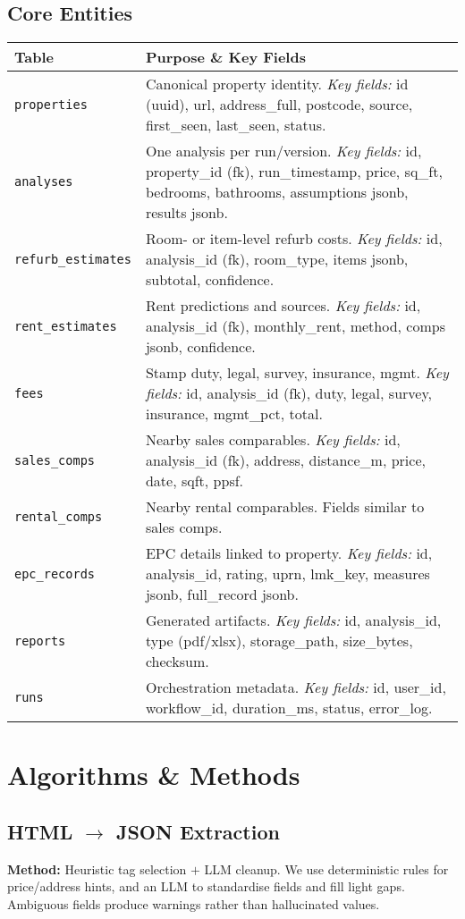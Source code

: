 \documentclass[12pt,a4paper]{article}
\begin{document}
\subsection{Core Entities}
\begin{longtable}{@{}p{3.2cm}p{12.4cm}@{}}
\toprule
\textbf{Table} & \textbf{Purpose \& Key Fields} \\
\midrule
\texttt{properties} & Canonical property identity. \textit{Key fields:} id (uuid), url, address\_full, postcode, source, first\_seen, last\_seen, status. \\
\texttt{analyses} & One analysis per run/version. \textit{Key fields:} id, property\_id (fk), run\_timestamp, price, sq\_ft, bedrooms, bathrooms, assumptions jsonb, results jsonb. \\
\texttt{refurb\_estimates} & Room- or item-level refurb costs. \textit{Key fields:} id, analysis\_id (fk), room\_type, items jsonb, subtotal, confidence. \\
\texttt{rent\_estimates} & Rent predictions and sources. \textit{Key fields:} id, analysis\_id (fk), monthly\_rent, method, comps jsonb, confidence. \\
\texttt{fees} & Stamp duty, legal, survey, insurance, mgmt. \textit{Key fields:} id, analysis\_id (fk), duty, legal, survey, insurance, mgmt\_pct, total. \\
\texttt{sales\_comps} & Nearby sales comparables. \textit{Key fields:} id, analysis\_id (fk), address, distance\_m, price, date, sqft, ppsf. \\
\texttt{rental\_comps} & Nearby rental comparables. Fields similar to sales comps. \\
\texttt{epc\_records} & EPC details linked to property. \textit{Key fields:} id, analysis\_id, rating, uprn, lmk\_key, measures jsonb, full\_record jsonb. \\
\texttt{reports} & Generated artifacts. \textit{Key fields:} id, analysis\_id, type (pdf/xlsx), storage\_path, size\_bytes, checksum. \\
\texttt{runs} & Orchestration metadata. \textit{Key fields:} id, user\_id, workflow\_id, duration\_ms, status, error\_log. \\
\bottomrule
\end{longtable}


\section{Algorithms \& Methods}
\subsection{HTML \texorpdfstring{$\rightarrow$}{->} JSON Extraction}
\textbf{Method:} Heuristic tag selection $+$ LLM cleanup. We use deterministic rules for price/address hints, and an LLM to standardise fields and fill light gaps. Ambiguous fields produce warnings rather than hallucinated values.
\end{document}
